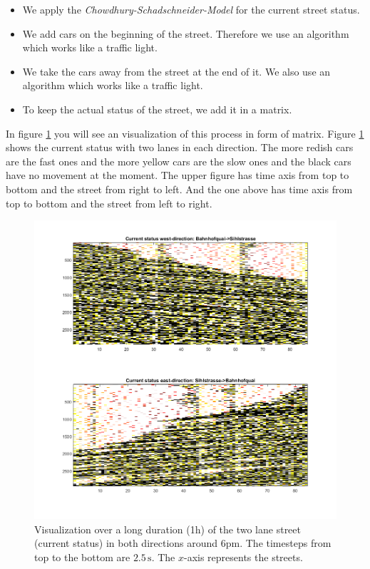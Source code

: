 \documentclass[11pt]{article}
\begin{document}
\begin{itemize}
\item[1.] We apply the \textit{Chowdhury-Schadschneider-Model} for the current street status.
\item[2.] We add cars on the beginning of the street. Therefore we use an algorithm which works like a traffic light.
\item[3.] We take the cars away from the street at the end of it. We also use an algorithm which works like a traffic light.
\item[4.] To keep the actual status of the street, we add it in a matrix.
\end{itemize}  
In figure \ref{carfigure} you will see an visualization of this process in form of matrix. Figure \ref{carfigure} shows the current status with two lanes in each direction. The more redish cars are the fast ones and the more yellow cars are the slow ones and the black cars have no movement at the moment. The upper figure has time axis from top to bottom and the street from right to left. And the one above has time axis from top to bottom and the street from left to right.
\newpage
\begin{figure}[h!]
	\centering
\includegraphics[width=\textwidth]{Current_6pm.png}
\caption{Visualization over a long duration (1h) of the two lane street (current status) in both directions around 6pm. The timesteps from top to the bottom are $2.5\,\mathrm{s}$. The $x$-axis represents the streets. }
\label{carfigure}
\end{figure}
\end{document}
